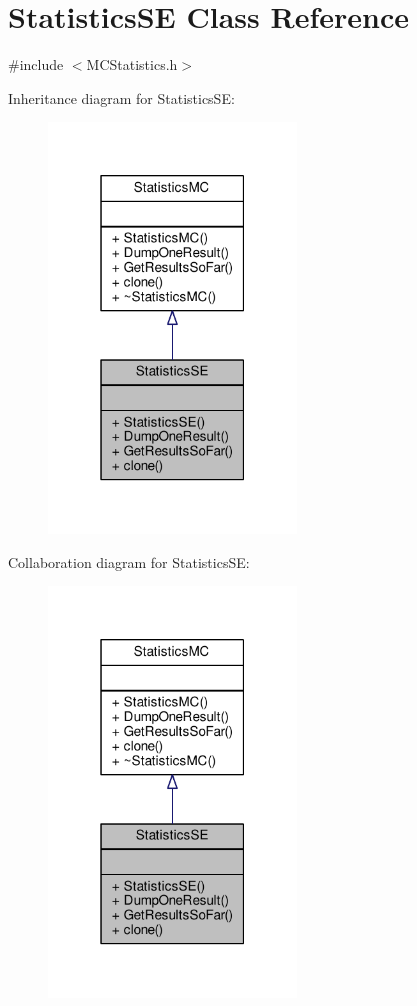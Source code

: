 \hypertarget{classStatisticsSE}{}\section{Statistics\+SE Class Reference}
\label{classStatisticsSE}


{\ttfamily \#include $<$M\+C\+Statistics.\+h$>$}



Inheritance diagram for Statistics\+SE\+:
\nopagebreak
\begin{figure}[H]
\begin{center}
\leavevmode
\includegraphics[width=187pt]{classStatisticsSE__inherit__graph}
\end{center}
\end{figure}


Collaboration diagram for Statistics\+SE\+:
\nopagebreak
\begin{figure}[H]
\begin{center}
\leavevmode
\includegraphics[width=187pt]{classStatisticsSE__coll__graph}
\end{center}
\end{figure}
